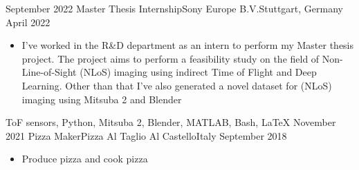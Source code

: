 %
%
%
\begin{experiences}
    \experience
        {September 2022}    {Master Thesis Internship}{Sony Europe B.V.}{Stuttgart, Germany}
        {April 2022}        {\begin{itemize}
                                 \item I've worked in the R\&D department as an intern to perform my Master thesis project. The project aims to perform a feasibility study on the field of Non-Line-of-Sight (NLoS) imaging using indirect Time of Flight and Deep Learning. Other than that I've also generated a novel dataset for (NLoS) imaging using Mitsuba 2 and Blender
                             \end{itemize}
                            }
                            {ToF sensors, Python, Mitsuba 2, Blender, MATLAB, Bash, \LaTeX}
    \emptySeparator
    \experienceNoTech
        {November 2021}     {Pizza Maker}{Pizza Al Taglio Al Castello}{Italy}
        {September 2018}    {\begin{itemize}
                                \item Produce pizza and cook pizza                   
                             \end{itemize}
                            }
                    
\end{experiences}
